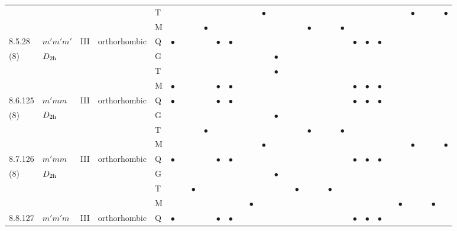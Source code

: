 \documentclass[fleqn,9pt,landscape]{jsarticle}
\begin{document}
\begin{longtable}{lllll|l|lll|ll|lll|l|lll|lll|l|ll|lll|lll}
 &  &  &  & T &  &  &  &  &  &  &  &  & $\bullet$ &  &  &  &  &  &  &  &  &  &  &  &  & $\bullet$ &  &  & $\bullet$ \\
 &  &  &  & M &  &  &  & $\bullet$ &  &  &  &  &  &  &  &  & $\bullet$ &  &  & $\bullet$ &  &  &  &  &  &  &  &  &  \\ \hline
8.5.28 & \texttt{$m'm'm'$} & III & orthorhombic & Q & $\bullet$ &  &  &  & $\bullet$ & $\bullet$ &  &  &  &  &  &  &  &  &  &  & $\bullet$ & $\bullet$ & $\bullet$ &  &  &  &  &  &  \\
(8) & $D_{\rm 2h}$ &  &  & G &  &  &  &  &  &  &  &  &  & $\bullet$ &  &  &  &  &  &  &  &  &  &  &  &  &  &  &  \\
 &  &  &  & T &  &  &  &  &  &  &  &  &  & $\bullet$ &  &  &  &  &  &  &  &  &  &  &  &  &  &  &  \\
 &  &  &  & M & $\bullet$ &  &  &  & $\bullet$ & $\bullet$ &  &  &  &  &  &  &  &  &  &  & $\bullet$ & $\bullet$ & $\bullet$ &  &  &  &  &  &  \\ \hline
8.6.125 & \texttt{$m'mm$} & III & orthorhombic & Q & $\bullet$ &  &  &  & $\bullet$ & $\bullet$ &  &  &  &  &  &  &  &  &  &  & $\bullet$ & $\bullet$ & $\bullet$ &  &  &  &  &  &  \\
(8) & $D_{\rm 2h}$ &  &  & G &  &  &  &  &  &  &  &  &  & $\bullet$ &  &  &  &  &  &  &  &  &  &  &  &  &  &  &  \\
 &  &  &  & T &  &  &  & $\bullet$ &  &  &  &  &  &  &  &  & $\bullet$ &  &  & $\bullet$ &  &  &  &  &  &  &  &  &  \\
 &  &  &  & M &  &  &  &  &  &  &  &  & $\bullet$ &  &  &  &  &  &  &  &  &  &  &  &  & $\bullet$ &  &  & $\bullet$ \\ \hline
8.7.126 & \texttt{$m'mm$} & III & orthorhombic & Q & $\bullet$ &  &  &  & $\bullet$ & $\bullet$ &  &  &  &  &  &  &  &  &  &  & $\bullet$ & $\bullet$ & $\bullet$ &  &  &  &  &  &  \\
(8) & $D_{\rm 2h}$ &  &  & G &  &  &  &  &  &  &  &  &  & $\bullet$ &  &  &  &  &  &  &  &  &  &  &  &  &  &  &  \\
 &  &  &  & T &  &  & $\bullet$ &  &  &  &  &  &  &  &  & $\bullet$ &  &  & $\bullet$ &  &  &  &  &  &  &  &  &  &  \\
 &  &  &  & M &  &  &  &  &  &  &  & $\bullet$ &  &  &  &  &  &  &  &  &  &  &  &  & $\bullet$ &  &  & $\bullet$ &  \\ \hline
8.8.127 & \texttt{$m'm'm$} & III & orthorhombic & Q & $\bullet$ &  &  &  & $\bullet$ & $\bullet$ &  &  &  &  &  &  &  &  &  &  & $\bullet$ & $\bullet$ & $\bullet$ &  &  &  &  &  &  \\

\end{longtable}
\end{document}
